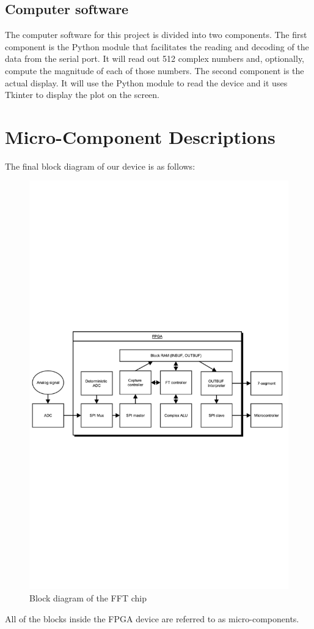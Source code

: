\documentclass[12pt]{article}
\begin{document}
    \subsection*{Computer software}
      The computer software for this project is divided into two components. The first component is the Python module that facilitates the reading and decoding of the data from the serial port. It will read out 512 complex numbers and, optionally, compute the magnitude of each of those numbers. The second component is the actual display. It will use the Python module to read the device and it uses Tkinter to display the plot on the screen.

  \section*{Micro-Component Descriptions}
    The final block diagram of our device is as follows:
    \begin{figure}[H]
      \centering
      \includegraphics[trim=0 400 0 400,clip,width=140mm]{vhdl_fft.pdf}
      \caption{Block diagram of the FFT chip}
      \label{overflow}
    \end{figure}
    All of the blocks inside the FPGA device are referred to as micro-components.
\end{document}
